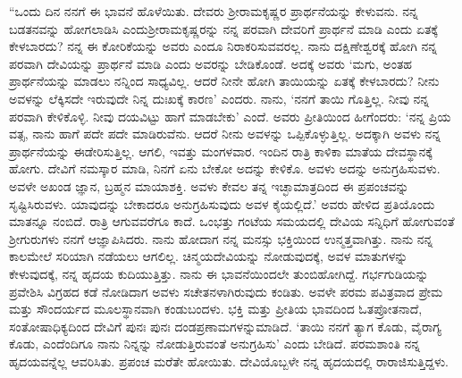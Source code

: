 “ಒಂದು ದಿನ ನನಗೆ ಈ ಭಾವನೆ ಹೊಳೆಯಿತು. ದೇವರು ಶ‍್ರೀರಾಮಕೃಷ್ಣರ ಪ್ರಾರ್ಥನೆಯನ್ನು ಕೇಳುವನು. ನನ್ನ ಬಡತನವನ್ನು ಹೋಗಲಾಡಿಸಿ ಎಂದು\break ಶ‍್ರೀರಾಮಕೃಷ್ಣರನ್ನು ನನ್ನ ಪರವಾಗಿ ದೇವರಿಗೆ ಪ್ರಾರ್ಥನೆ ಮಾಡಿ ಎಂದು ಏತಕ್ಕೆ ಕೇಳಬಾರದು? ನನ್ನ ಈ ಕೋರಿಕೆಯನ್ನು ಅವರು ಎಂದೂ ನಿರಾಕರಿಸುವವರಲ್ಲ. ನಾನು ದಕ್ಷಿಣೇಶ್ವರಕ್ಕೆ ಹೋಗಿ ನನ್ನ ಪರವಾಗಿ ದೇವಿಯನ್ನು ಪ್ರಾರ್ಥನೆ ಮಾಡಿ ಎಂದು ಅವರನ್ನು ಬೇಡಿಕೊಂಡೆ. ಅದಕ್ಕೆ ಅವರು ‘ಮಗು, ಅಂತಹ ಪ್ರಾರ್ಥನೆಯನ್ನು ಮಾಡಲು ನನ್ನಿಂದ ಸಾಧ್ಯವಿಲ್ಲ. ಆದರೆ ನೀನೇ ಹೋಗಿ ತಾಯಿಯನ್ನು ಏತಕ್ಕೆ ಕೇಳಬಾರದು? ನೀನು ಅವಳನ್ನು ಲೆಕ್ಕಿಸದೇ ಇರುವುದೇ ನಿನ್ನ ದುಃಖಕ್ಕೆ ಕಾರಣ’ ಎಂದರು. ನಾನು, ‘ನನಗೆ ತಾಯಿ ಗೊತ್ತಿಲ್ಲ. ನೀವು ನನ್ನ ಪರವಾಗಿ ಕೇಳಿಕೊಳ್ಳಿ. ನೀವು ದಯವಿಟ್ಟು ಹಾಗೆ ಮಾಡಬೇಕು’ ಎಂದೆ. ಅವರು ಪ್ರೀತಿಯಿಂದ ಹೀಗೆಂದರು: ‘ನನ್ನ ಪ್ರಿಯ ವತ್ಸ, ನಾನು ಹಾಗೆ ಪದೇ ಪದೇ ಮಾಡಿರುವೆನು. ಆದರೆ ನೀನು ಅವಳನ್ನು ಒಪ್ಪಿಕೊಳ್ಳುತ್ತಿಲ್ಲ. ಅದಕ್ಕಾಗಿ ಅವಳು ನನ್ನ ಪ್ರಾರ್ಥನೆಯನ್ನು ಈಡೇರಿಸುತ್ತಿಲ್ಲ. ಆಗಲಿ, ಇವತ್ತು ಮಂಗಳವಾರ. ಇಂದಿನ ರಾತ್ರಿ ಕಾಳಿಕಾ ಮಾತೆಯ ದೇವಸ್ಥಾನಕ್ಕೆ ಹೋಗು. ದೇವಿಗೆ ನಮಸ್ಕಾರ ಮಾಡಿ, ನಿನಗೆ ಏನು ಬೇಕೋ ಅದನ್ನು ಕೇಳಿಕೊ. ಅವಳು ಅದನ್ನು ಅನುಗ್ರಹಿಸುವಳು. ಅವಳೇ ಅಖಂಡ ಜ್ಞಾನ, ಬ್ರಹ್ಮನ ಮಾಯಾಶಕ್ತಿ. ಅವಳು ಕೇವಲ ತನ್ನ ಇಚ್ಛಾಮಾತ್ರದಿಂದ ಈ ಪ್ರಪಂಚವನ್ನು ಸೃಷ್ಟಿಸಿರುವಳು. ಯಾವುದನ್ನು ಬೇಕಾದರೂ ಅನುಗ್ರಹಿಸುವುದು ಅವಳ ಕೈಯಲ್ಲಿದೆ.’ ಅವರು ಹೇಳಿದ ಪ್ರತಿಯೊಂದು ಮಾತನ್ನೂ ನಂಬಿದೆ. ರಾತ್ರಿ ಆಗುವವರೆಗೂ ಕಾದೆ. ಒಂಭತ್ತು ಗಂಟೆಯ ಸಮಯದಲ್ಲಿ ದೇವಿಯ ಸನ್ನಿಧಿಗೆ ಹೋಗುವಂತೆ ಶ‍್ರೀಗುರುಗಳು ನನಗೆ ಆಜ್ಞಾಪಿಸಿದರು. ನಾನು ಹೋದಾಗ ನನ್ನ ಮನಸ್ಸು ಭಕ್ತಿಯಿಂದ ಉನ್ಮತ್ತವಾಗಿತ್ತು. ನಾನು ನನ್ನ ಕಾಲಮೇಲೆ ಸರಿಯಾಗಿ ನಡೆಯಲು ಆಗಲಿಲ್ಲ. ಚಿನ್ಮಯದೇವಿಯನ್ನು ನೋಡುವುದಕ್ಕೆ, ಅವಳ ಮಾತುಗಳನ್ನು ಕೇಳುವುದಕ್ಕೆ, ನನ್ನ ಹೃದಯ ಕುದಿಯುತ್ತಿತ್ತು. ನಾನು ಈ ಭಾವನೆಯಿಂದಲೇ ತುಂಬಿಹೋಗಿದ್ದೆ. ಗರ್ಭಗುಡಿಯನ್ನು ಪ್ರವೇಶಿಸಿ ವಿಗ್ರಹದ ಕಡೆ ನೋಡಿದಾಗ ಅವಳು ಸಚೇತನಳಾಗಿರುವುದು ಕಂಡಿತು. ಅವಳೇ ಪರಮ ಪವಿತ್ರವಾದ ಪ್ರೇಮ ಮತ್ತು ಸೌಂದರ್ಯದ ಮೂಲಸ್ಥಾನವಾಗಿ ಕಂಡುಬಂದಳು. ಭಕ್ತಿ ಮತ್ತು ಪ್ರೀತಿಯ ಭಾವದಿಂದ ಓತಪ್ರೋತನಾದೆ, ಸಂತೋಷಾಧಿಕ್ಯದಿಂದ ದೇವಿಗೆ ಪುನಃ ಪುನಃ ದಂಡಪ್ರಣಾಮಗಳನ್ನು\break ಮಾಡಿದೆ. ‘ತಾಯಿ ನನಗೆ ತ್ಯಾಗ ಕೊಡು, ವೈರಾಗ್ಯ ಕೊಡು, ಎಂದೆಂದಿಗೂ ನಾನು ನಿನ್ನನ್ನು ನೋಡುತ್ತಿರುವಂತೆ ಅನುಗ್ರಹಿಸು’ ಎಂದು ಬೇಡಿದೆ. ಪರಮಶಾಂತಿ ನನ್ನ ಹೃದಯವನ್ನೆಲ್ಲ ಆವರಿಸಿತು. ಪ್ರಪಂಚ ಮರೆತೇ ಹೋಯಿತು. ದೇವಿಯೊಬ್ಬಳೇ ನನ್ನ ಹೃದಯದಲ್ಲಿ ರಾರಾಜಿಸುತ್ತಿದ್ದಳು.

